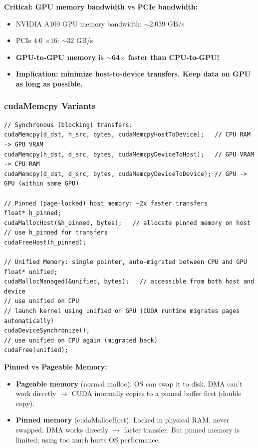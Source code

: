 \documentclass[11pt,a4paper]{article}
\newcommand{\term}[1]{\textbf{\color{darkblue}#1}}
\begin{document}
\textbf{Critical: GPU memory bandwidth vs PCIe bandwidth:}
\begin{itemize}[noitemsep]
  \item NVIDIA A100 GPU memory bandwidth: $\sim$2,039 GB/s
  \item PCIe 4.0 $\times$16: $\sim$32 GB/s
  \item \textbf{GPU-to-GPU memory is $\sim$64$\times$ faster than CPU-to-GPU!}
  \item \textbf{Implication: minimize host-to-device transfers. Keep data on GPU as long as possible.}
\end{itemize}

\subsubsection{cudaMemcpy Variants}

\begin{lstlisting}
// Synchronous (blocking) transfers:
cudaMemcpy(d_dst, h_src, bytes, cudaMemcpyHostToDevice);   // CPU RAM -> GPU VRAM
cudaMemcpy(h_dst, d_src, bytes, cudaMemcpyDeviceToHost);   // GPU VRAM -> CPU RAM
cudaMemcpy(d_dst, d_src, bytes, cudaMemcpyDeviceToDevice); // GPU -> GPU (within same GPU)

// Pinned (page-locked) host memory: ~2x faster transfers
float* h_pinned;
cudaMallocHost(&h_pinned, bytes);   // allocate pinned memory on host
// use h_pinned for transfers
cudaFreeHost(h_pinned);

// Unified Memory: single pointer, auto-migrated between CPU and GPU
float* unified;
cudaMallocManaged(&unified, bytes);   // accessible from both host and device
// use unified on CPU
// launch kernel using unified on GPU (CUDA runtime migrates pages automatically)
cudaDeviceSynchronize();
// use unified on CPU again (migrated back)
cudaFree(unified);
\end{lstlisting}

\textbf{Pinned vs Pageable Memory:}
\begin{itemize}[noitemsep]
  \item \term{Pageable memory} (normal malloc): OS can swap it to disk. DMA can't work directly $\to$ CUDA internally copies to a pinned buffer first (double copy).
  \item \term{Pinned memory} (cudaMallocHost): Locked in physical RAM, never swapped. DMA works directly $\to$ faster transfer. But pinned memory is limited; using too much hurts OS performance.
\end{itemize}
\end{document}
